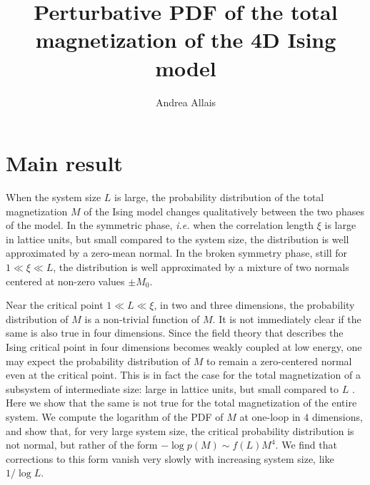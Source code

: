 \documentclass[11pt,a4paper]{article}
\title{Perturbative PDF of the total magnetization of the 4D Ising model }
\author[a]{Andrea Allais}
\affiliation[a]{Independent scholar}
\begin{document}
\maketitle

\section{Main result}

When the system size $L$ is large, the probability distribution of the total
magnetization $M$ of the Ising model changes qualitatively between the two
phases of the model. In the symmetric phase, \textit{i.e.} when the correlation
length $\xi$ is large in lattice units, but small compared to the system size,
the distribution is well approximated by a zero-mean normal.  In the broken
symmetry phase, still for $1 \ll \xi \ll L$, the distribution is well
approximated by a mixture of two normals centered at non-zero values $\pm
M_0$.

Near the critical point $1 \ll L \ll \xi$, in two and three dimensions, the
probability distribution of $M$ is a non-trivial function of $M$.  It is not
immediately clear if the same is also true in four dimensions. Since the field
theory that describes the Ising critical point in four dimensions becomes
weakly coupled at low energy, one may expect the probability distribution of
$M$ to remain a zero-centered normal even at the critical point. This is in
fact the case for the total magnetization of a subsystem of intermediate size:
large in lattice units, but small compared to $L$ \cite{Binder1981}. Here we
show that the same is not true for the total magnetization of the entire
system. We compute the logarithm of the PDF of $M$ at one-loop in $4$
dimensions, and show that, for very large system size, the critical probability
distribution is not normal, but rather of the form $-\log p(M)\sim f(L) M^4$.
We find that corrections to this form vanish very slowly with increasing system
size, like $1/\log L$.
\end{document}
